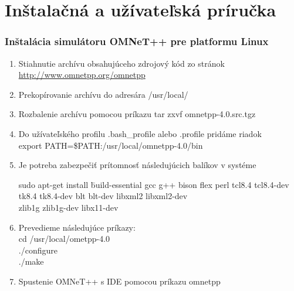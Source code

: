 \documentclass[11pt,twoside,a4paper]{book}
\begin{document}
\chapter{Inštalačná a užívateľská príručka}

\subsection{Inštalácia simulátoru OMNeT++ pre platformu Linux}
\begin{enumerate}
 \item Stiahnutie archívu obsahujúceho zdrojový kód zo stránok \\
 \url{http://www.omnetpp.org/omnetpp}
 \item Prekopírovanie archívu do adresára /usr/local/
 \item Rozbalenie archívu pomocou príkazu tar zxvf omnetpp-4.0.src.tgz
 \item Do užívateľského profilu .bash\_profile alebo .profile pridáme riadok \\
  export PATH=\$PATH:/usr/local/omnetpp-4.0/bin
  \item Je potreba zabezpečiť prítomnosť následujúcich balíkov v systéme 
    \begin{tabbing}
    sudo apt-get install \= build-essential gcc g++ bison flex perl tcl8.4 tcl8.4-dev \\
                       \> tk8.4 tk8.4-dev blt blt-dev libxml2 libxml2-dev \\
                       \> zlib1g zlib1g-dev libx11-dev
    \end{tabbing}    
 \item Prevedieme následujúce príkazy: \\
   cd /usr/local/ometpp-4.0 \\
   ./configure \\
   ./make
 \item Spustenie OMNeT++ s IDE pomocou príkazu omnetpp 
\end{enumerate}
\end{document}
